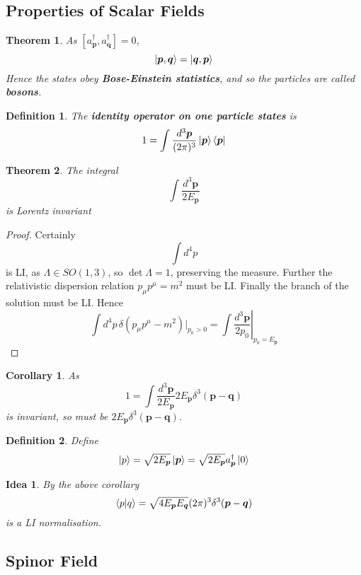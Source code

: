 \documentclass{article}
\newtheorem{theorem}{Theorem}[subsection]
\newtheorem{corollary}{Corollary}[theorem]
\newtheorem{definition}{Definition}[subsection]
\newtheorem*{idea}{Idea}
\newcommand{\tmeas}{\frac{d^3\bm{p}}{(2\pi)^3}}
\newcommand{\bam}[1]{\textbf{#1}}
\newcommand{\comm}[2][]{\left[ #1, #2 \right]} %
\begin{document}
\subsection{Properties of Scalar Fields}

\begin{theorem}
As $\comm[a_{\bm{p}}^\dagger]{a_{\bm{q}}^\dagger}=0$,
\[
\ket{\bm{p},\bm{q}}=\ket{\bm{q},\bm{p}}
\]
Hence the states obey \bam{Bose-Einstein statistics}, and so the particles are called \bam{bosons}.
\end{theorem}


\begin{definition}
The \bam{identity operator on one particle states} is 
\[
1=\int \tmeas \ket{\bm{p}}\bra{\bm{p}}
\]
\end{definition}

\begin{theorem}
The integral 
\[
\int \frac{d^3 \bm{p}}{2E_{\bm{p}}}
\]
is Lorentz invariant
\end{theorem}
\begin{proof}
Certainly 
\[
\int d^4 p 
\]
is LI, as $\Lambda\in SO(1,3)$, so $\det\Lambda=1$, preserving the measure. Further the relativistic dispersion relation $p_\mu p^\mu=m^2$ must be LI. Finally the branch of the solution must be LI. Hence 
\[
\int d^4p \, \delta(p_\mu p^\mu-m^2)|_{p_0>0} = \int \left. \frac{d^3\bm{p}}{2p_0} \right|_{p_0=E_{\bm{p}}}
\]
\end{proof}

\begin{corollary}
As 
\[
1=\int \frac{d^3 \bm{p}}{2E_{\bm{p}}} 2E_{\bm{p}} \delta^3(\bm{p}-\bm{q})
\]
is invariant, so must be $2E_{\bm{p}} \delta^3(\bm{p}-\bm{q})$.
\end{corollary}

\begin{definition}
Define 
\[
\ket{p}=\sqrt{2E_{\bm{p}}}\ket{\bm{p}}=\sqrt{2E_{\bm{p}}}a_{\bm{p}}^\dagger \ket{0}
\]
\end{definition}

\begin{idea}
By the above corollary 
\[
\braket{p|q}=\sqrt{4E_{\bm{p}}E_{\bm{q}}}(2\pi)^3 \delta^3(\bm{p}-\bm{q})
\]
is a LI normalisation. 
\end{idea}

\subsection{Spinor Field}
\end{document}
